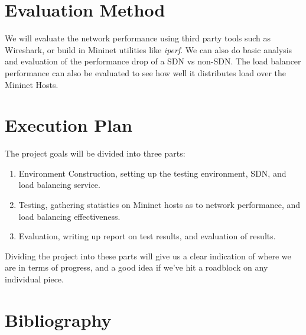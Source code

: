 \documentclass[12pt,letterpaper,onecolumn,draftclsnofoot]{IEEEtran}
\begin{document}
\section{Evaluation Method}
We will evaluate the network performance using third party tools such as 
Wireshark, or build in Mininet utilities like \textit{iperf}.\cite{design} We
can also do basic analysis and evaluation of the performance drop of a SDN vs
non-SDN. The load balancer performance can also be evaluated to see how well it
distributes load over the Mininet Hosts.

\section{Execution Plan}
The project goals will be divided into three parts:

\begin{enumerate}
\item Environment Construction, setting up the testing environment, SDN, and 
	load balancing service. 
\item Testing, gathering statistics on Mininet hosts as to network performance,
	and load balancing effectiveness.
\item Evaluation, writing up report on test results, and evaluation of results.
\end{enumerate}

Dividing the project into these parts will give us a clear indication of where
we are in terms of progress, and a good idea if we've hit a roadblock on any
individual piece. 

\section{Bibliography}


\end{document}
